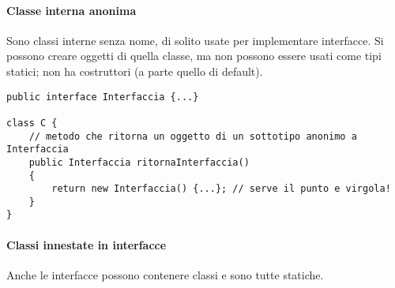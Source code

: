 \paragraph{Classe interna anonima}
Sono classi interne senza nome, di solito usate per implementare interfacce. Si possono creare oggetti di quella classe, ma non possono essere usati come tipi statici; non ha costruttori (a parte quello di default).
\begin{lstlisting}
public interface Interfaccia {...}

class C {
    // metodo che ritorna un oggetto di un sottotipo anonimo a Interfaccia
    public Interfaccia ritornaInterfaccia()
    {
        return new Interfaccia() {...}; // serve il punto e virgola!
    }
}
\end{lstlisting} 
\paragraph{Classi innestate in interfacce}
Anche le interfacce possono contenere classi e sono tutte statiche.

